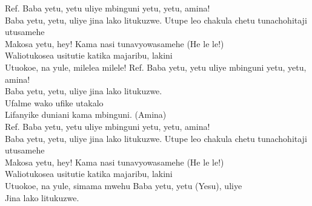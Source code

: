 \begin{flushleft}
Ref. Baba yetu, yetu uliye mbinguni yetu, yetu, amina! \\
\hspace{0.9cm}Baba yetu, yetu, uliye jina lako litukuzwe.
\vskip 3mm
Utupe leo chakula chetu tunachohitaji utusamehe \\
Makosa yetu, hey!  Kama nasi tunavyowasamehe (He le le!)\\
Waliotukosea usitutie katika majaribu, lakini \tab{}\\
Utuokoe, na yule, milelea milele! \tab{}
\vskip 3mm
Ref. Baba yetu, yetu uliye mbinguni yetu, yetu, amina! \\
\hspace{0.9cm}Baba yetu, yetu, uliye jina lako litukuzwe. 
\vskip 3mm
\tab{}\tab{}\\
\tab{}\tab{}
\vskip 3mm
Ufalme wako ufike utakalo \tab{}\\
Lifanyike duniani kama mbinguni. (Amina) 
\vskip 3mm
\tab{}\tab{}\\
\tab{}\tab{}
\vskip 3mm
Ref. Baba yetu, yetu uliye mbinguni yetu, yetu, amina! \\
\hspace{0.9cm}Baba yetu, yetu, uliye jina lako litukuzwe. 
\vskip 3mm
Utupe leo chakula chetu tunachohitaji utusamehe\\
Makosa yetu, hey!  Kama nasi tunavyowasamehe (He le le!)\\
Waliotukosea usitutie katika majaribu, lakini\\
Utuokoe, na yule, simama mwehu
\vskip 3mm
Baba yetu, yetu (Yesu), uliye \tab{} \\
Jina lako litukuzwe. \tab{}\\
\tab{}\tab{}
\end{flushleft}
\newpage

